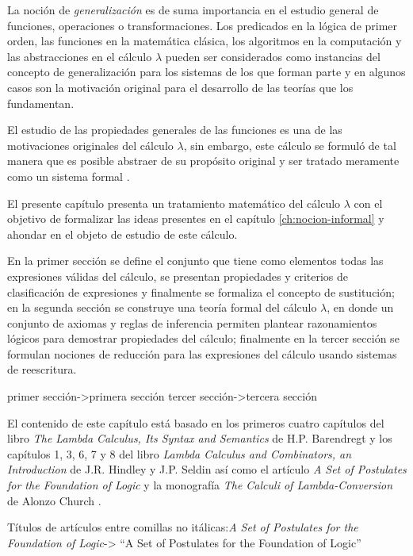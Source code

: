 La noción de \emph{generalización} es de suma importancia en el estudio general de funciones, operaciones o transformaciones. Los predicados en la lógica de primer orden, las funciones en la matemática clásica, los algoritmos en la computación y las abstracciones en el cálculo \( λ \) pueden ser considerados como instancias del concepto de generalización para los sistemas de los que forman parte y en algunos casos son la motivación original para el desarrollo de las teorías que los fundamentan.

El estudio de las propiedades generales de las funciones es una de las motivaciones originales del cálculo \( λ \), sin embargo, este cálculo se formuló de tal manera que es posible abstraer de su propósito original y ser tratado meramente como un sistema formal \cite{Church:LambdaConversion}.

El presente capítulo presenta un tratamiento matemático del cálculo \( λ \) con el objetivo de formalizar las ideas presentes en el capítulo \ref{ch:nocion-informal} y ahondar en el objeto de estudio de este cálculo.

En la primer sección se define el conjunto que tiene como elementos todas las expresiones válidas del cálculo, se presentan propiedades y criterios de clasificación de expresiones y finalmente se formaliza el concepto de sustitución; en la segunda sección se construye una teoría formal del cálculo \( λ \), en donde un conjunto de axiomas y reglas de inferencia permiten plantear razonamientos lógicos para demostrar propiedades del cálculo; finalmente en la tercer sección se formulan nociones de reducción para las expresiones del cálculo usando sistemas de reescritura.

\begin{Gutu}
primer sección->primera sección
tercer sección->tercera sección
\end{Gutu}

El contenido de este capítulo está basado en los primeros cuatro capítulos del libro \emph{The Lambda Calculus, Its Syntax and Semantics} de H.P. Barendregt \cite{Barendregt:Bible} y los capítulos 1, 3, 6, 7 y 8 del libro \emph{Lambda Calculus and Combinators, an Introduction} de J.R. Hindley y J.P. Seldin \cite{HindleySeldin:LambdaCalculusAndCombinators} así como el artículo \emph{A Set of Postulates for the Foundation of Logic} y la monografía \emph{The Calculi of Lambda-Conversion} de Alonzo Church \cite{Church:FoundationsLogic,Church:LambdaConversion}.

\begin{Gutu}
Títulos de artículos entre comillas no itálicas:\emph{A Set of Postulates for the Foundation of Logic}-> ``A Set of Postulates for the Foundation of Logic''
\end{Gutu}

